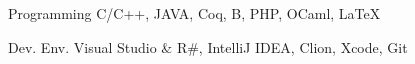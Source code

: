 

\begin{cvskills}

  \cvskill
    {Programming} %
    {C/C++, JAVA, Coq, B, PHP, OCaml, \LaTeX} %

  \cvskill
    {Dev. Env.} %
    {Visual Studio \& R\#, IntelliJ IDEA, Clion, Xcode, Git} %

\end{cvskills}
